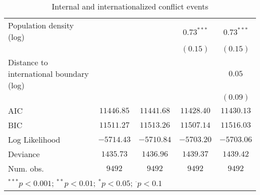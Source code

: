 \begin{sidewaystable}
\begin{center}
{\begin{tabular}{l c c c c}
Population density (log)                 &               &               & $0.73^{***}$  & $0.73^{***}$  \\
                                         &               &               & $(0.15)$      & $(0.15)$      \\
Distance to international boundary (log) &               &               &               & $0.05$        \\
                                         &               &               &               & $(0.09)$      \\
\midrule
AIC                                      & $11446.85$    & $11441.68$    & $11428.40$    & $11430.13$    \\
BIC                                      & $11511.27$    & $11513.26$    & $11507.14$    & $11516.03$    \\
Log Likelihood                           & $-5714.43$    & $-5710.84$    & $-5703.20$    & $-5703.06$    \\
Deviance                                 & $1435.73$     & $1436.96$     & $1439.37$     & $1439.42$     \\
Num. obs.                                & $9492$        & $9492$        & $9492$        & $9492$        \\
\bottomrule
\multicolumn{5}{l}{\scriptsize{$^{***}p<0.001$; $^{**}p<0.01$; $^{*}p<0.05$; $^{\cdot}p<0.1$}}
\end{tabular}
}
\caption{Internal and internationalized conflict events}
\label{interaction_both}
\end{center}
\end{sidewaystable}
